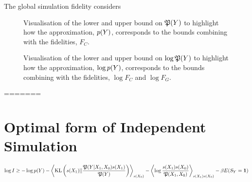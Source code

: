 \documentclass[]{article}
\begin{document}
The global simulation fidelity considers
\begin{figure}
    \centering
    \def\svgwidth{\textwidth}
   
    \caption{Visualisation of the lower and upper bound on
      $\mathfrak{P}(Y)$ to highlight how the approximation,
      $p(Y)$, corresponds to the bounds
      combining with the fidelities, $F_C$.}
    \label{fig-py-bounds}
\end{figure}



\begin{figure}
  \centering
  \def\svgwidth{\textwidth}
    
    \caption{Visualisation of the lower and upper bound on $\log
      \mathfrak{P}(Y)$ to highlight how the approximation,
      $\log p(Y)$, corresponds to the bounds
      combining with the fidelities, $\log F_C$ and $\log F_G$.}
    \label{fig-log-py-bounds}
\end{figure}
=======
\section{Optimal form of Independent Simulation} \label{sec-optimal-form-of-independent-simulation}


$$
\log I \geq -\log p(Y) - \left\langle \text{KL}\left(s({X_1}) || \frac{\mathfrak{P}(Y | {X_1},{X_0})s({X_1})}{\mathfrak{P}(Y)}\right) \right\rangle_{s({X_0})}  - \left\langle \log \frac{s({X_1})s({X_0})}{\mathfrak{P}({X_1},{X_0})} \right\rangle_{s({X_1})s({X_0})}  -\beta E(S_Y=\textbf{1})
$$
\end{document}

